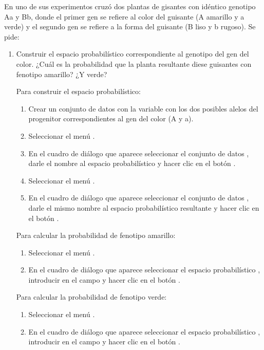 \begin{enumerate}[leftmargin=*]
En uno de sus experimentos cruzó dos plantas de gisantes con idéntico genotipo Aa y Bb, donde el primer gen se refiere al color del guisante
(A amarillo y a verde) y el segundo gen se refiere a la forma del guisante (B liso y b rugoso). Se pide:
\begin{enumerate}
\item Construir el espacio probabilístico correspondiente al genotipo del gen del color. 
¿Cuál es la probabilidad que la planta resultante diese guisantes con fenotipo amarillo? 
¿Y verde?
\begin{indicacion}
Para construir el espacio probabilístico: 
\begin{enumerate}
\item Crear un conjunto de datos  con la variable  con los dos posibles alelos del
progenitor correspondientes al gen del color (A y a).
\item Seleccionar el menú .
\item En el cuadro de diálogo que aparece seleccionar el conjunto de datos , darle el nombre
 al espacio probabilístico y hacer clic en el botón .
\item Seleccionar el menú .
\item En el cuadro de diálogo que aparece seleccionar el conjunto de datos , darle el mismo nombre al espacio
probabilístico resultante y hacer clic en el botón . 
\end{enumerate}
Para calcular la probabilidad de fenotipo amarillo:
\begin{enumerate}
\item Seleccionar el menú .
\item En el cuadro de diálogo que aparece seleccionar el espacio probabilístico , introducir
 en el campo  y hacer clic en el
botón .
\end{enumerate}
Para calcular la probabilidad de fenotipo verde:
\begin{enumerate}
\item Seleccionar el menú .
\item En el cuadro de diálogo que aparece seleccionar el espacio probabilístico , introducir
 en el campo  y hacer clic en el
botón .
\end{enumerate}
\end{indicacion}


\end{enumerate}
\end{enumerate}
